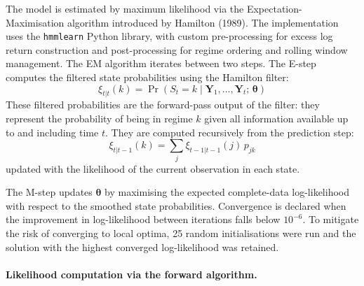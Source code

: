 \documentclass[12pt, a4paper]{article}
\begin{document}
The model is estimated by maximum likelihood via the Expectation-Maximisation algorithm
introduced by Hamilton (1989). The implementation uses the \texttt{hmmlearn} Python library,
with custom pre-processing for excess log return construction and post-processing for regime
ordering and rolling window management. The EM algorithm iterates between two steps. The
E-step computes the filtered state probabilities using the Hamilton filter:
\begin{equation}
  \xi_{t|t}(k) = \Pr\!\left(S_t = k \mid \mathbf{Y}_1,\ldots,\mathbf{Y}_t;\,
  \boldsymbol{\theta}\right)
  \label{eq:filtered}
\end{equation}
These filtered probabilities are the forward-pass output of the filter: they represent the
probability of being in regime $k$ given all information available up to and including
time $t$. They are computed recursively from the prediction step:
\begin{equation}
  \xi_{t|t-1}(k) = \sum_{j} \xi_{t-1|t-1}(j)\, p_{jk}
  \label{eq:prediction}
\end{equation}
updated with the likelihood of the current observation in each state.

The M-step updates $\boldsymbol{\theta}$ by maximising the expected complete-data
log-likelihood with respect to the smoothed state probabilities. Convergence is declared
when the improvement in log-likelihood between iterations falls below $10^{-6}$. To mitigate
the risk of converging to local optima, 25 random initialisations were run and the solution
with the highest converged log-likelihood was retained.

\paragraph*{Likelihood computation via the forward algorithm.}
\end{document}
